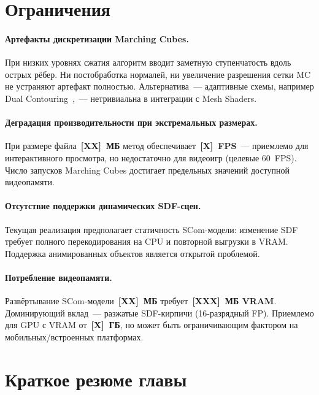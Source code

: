 \section{Ограничения}
\label{sec:limitations}

\paragraph{Артефакты дискретизации Marching Cubes.}
При низких уровнях сжатия алгоритм вводит заметную ступенчатость вдоль
острых рёбер. Ни постобработка нормалей, ни увеличение разрешения сетки MC
не устраняют артефакт полностью. Альтернатива~--- адаптивные схемы, например
Dual Contouring~\cite{ju2002dualcontouring},~--- нетривиальна в интеграции с
Mesh Shaders.

\paragraph{Деградация производительности при экстремальных размерах.}
При размере файла~\textbf{[XX]~МБ} метод обеспечивает~\textbf{[X]~FPS}~---
приемлемо для интерактивного просмотра, но недостаточно для видеоигр
(целевые 60~FPS). Число запусков Marching Cubes достигает предельных значений
доступной видеопамяти.

\paragraph{Отсутствие поддержки динамических SDF-сцен.}
Текущая реализация предполагает статичность SCom-модели: изменение SDF
требует полного перекодирования на CPU и повторной выгрузки в VRAM.
Поддержка анимированных объектов является открытой проблемой.

\paragraph{Потребление видеопамяти.}
Развёртывание SCom-модели~\textbf{[XX]~МБ} требует~\textbf{[XXX]~МБ VRAM}.
Доминирующий вклад~--- разжатые SDF-кирпичи (16-разрядный FP). Приемлемо
для GPU с VRAM от~\textbf{[X]~ГБ}, но может быть ограничивающим фактором на
мобильных/встроенных платформах.

\section*{Краткое резюме главы}

